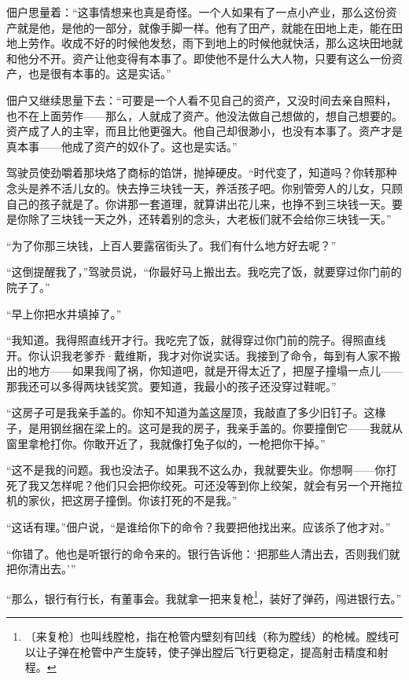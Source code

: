\documentclass[12pt,UTF-8,openany]{ctexbook}
\begin{document}
\begin{large}
    佃户思量着：“这事情想来也真是奇怪。一个人如果有了一点小产业，那么这份资产就是他，是他的一部分，就像手脚一样。他有了田产，就能在田地上走，能在田地上劳作。收成不好的时候他发愁，雨下到地上的时候他就快活，那么这块田地就和他分不开。资产让他变得有本事了。即使他不是什么大人物，只要有这么一份资产，也是很有本事的。这是实话。”
    
    佃户又继续思量下去：“可要是一个人看不见自己的资产，又没时间去亲自照料，也不在上面劳作——那么，人就成了资产。他没法做自己想做的，想自己想要的。资产成了人的主宰，而且比他更强大。他自己却很渺小，也没有本事了。资产才是真本事——他成了资产的奴仆了。这也是实话。”
    
    驾驶员使劲嚼着那块烙了商标的馅饼，抛掉硬皮。“时代变了，知道吗？你转那种念头是养不活儿女的。快去挣三块钱一天，养活孩子吧。你别管旁人的儿女，只顾自己的孩子就是了。你讲那一套道理，就算讲出花儿来，也挣不到三块钱一天。要是你除了三块钱一天之外，还转着别的念头，大老板们就不会给你三块钱一天。”
    
    “为了你那三块钱，上百人要露宿街头了。我们有什么地方好去呢？”
    
    “这倒提醒我了，”驾驶员说，“你最好马上搬出去。我吃完了饭，就要穿过你门前的院子了。”
    
    “早上你把水井填掉了。”
    
    “我知道。我得照直线开才行。我吃完了饭，就得穿过你门前的院子。得照直线开。你认识我老爹乔·戴维斯，我才对你说实话。我接到了命令，每到有人家不搬出的地方——如果我闯了祸，你知道吧，就是开得太近了，把屋子撞塌一点儿——那我还可以多得两块钱奖赏。要知道，我最小的孩子还没穿过鞋呢。”
    
    “这房子可是我亲手盖的。你知不知道为盖这屋顶，我敲直了多少旧钉子。这椽子，是用钢丝捆在梁上的。这可是我的房子，我亲手盖的。你要撞倒它——我就从窗里拿枪打你。你敢开近了，我就像打兔子似的，一枪把你干掉。”
    
    “这不是我的问题。我也没法子。如果我不这么办，我就要失业。你想啊——你打死了我又怎样呢？他们只会把你绞死。可还没等到你上绞架，就会有另一个开拖拉机的家伙，把这房子撞倒。你该打死的不是我。”
    
    “这话有理。”佃户说，“是谁给你下的命令？我要把他找出来。应该杀了他才对。”
    
    “你错了。他也是听银行的命令来的。银行告诉他：‘把那些人清出去，否则我们就把你清出去。’”
    
    “那么，银行有行长，有董事会。我就拿一把来复枪\footnote{〔来复枪〕也叫线膛枪，指在枪管内壁刻有凹线（称为膛线）的枪械。膛线可以让子弹在枪管中产生旋转，使子弹出膛后飞行更稳定，提高射击精度和射程。}，装好了弹药，闯进银行去。”
    

\end{large}
\end{document}
